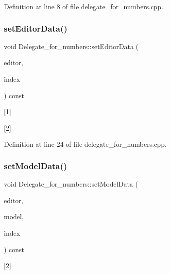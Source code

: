 Definition at line 8 of file delegate\+\_\+for\+\_\+numbers.\+cpp.

\mbox{\label{classDelegate__for__numbers_a182eaf8c7d3306a22415315fe53577d3}} 
\subsubsection{\texorpdfstring{set\+Editor\+Data()}{setEditorData()}}
{\footnotesize\ttfamily void Delegate\+\_\+for\+\_\+numbers\+::set\+Editor\+Data (\begin{DoxyParamCaption}\item[{Q\+Widget $\ast$}]{editor,  }\item[{const Q\+Model\+Index \&}]{index }\end{DoxyParamCaption}) const}



\mbox{[}1\mbox{]} 

\mbox{[}2\mbox{]} 

Definition at line 24 of file delegate\+\_\+for\+\_\+numbers.\+cpp.

\mbox{\label{classDelegate__for__numbers_a99f27c00eea2aa04248cb3410a9557de}} 
\subsubsection{\texorpdfstring{set\+Model\+Data()}{setModelData()}}
{\footnotesize\ttfamily void Delegate\+\_\+for\+\_\+numbers\+::set\+Model\+Data (\begin{DoxyParamCaption}\item[{Q\+Widget $\ast$}]{editor,  }\item[{Q\+Abstract\+Item\+Model $\ast$}]{model,  }\item[{const Q\+Model\+Index \&}]{index }\end{DoxyParamCaption}) const}



\mbox{[}2\mbox{]} 

